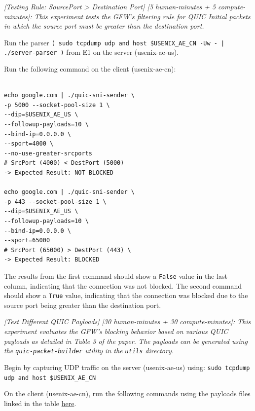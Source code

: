 \begin{compactdesc}
\begin{asparadesc}
\end{asparadesc}



\item[(E2):] \textit{[Testing Rule: SourcePort > Destination Port] [5 human-minutes + 5 compute-minutes]: This experiment tests the GFW's filtering rule for QUIC Initial packets in which the source port must be greater than the destination port.}
\begin{asparadesc}
    \item[Preparation:] Run the parser \texttt{( sudo tcpdump udp and host \$USENIX\_AE\_CN -Uw - | ./server-parser )} from E1 on the server (usenix-ae-us). 
    \item[Execution:] Run the following command on the client (usenix-ae-cn):

\begin{verbatim}

echo google.com | ./quic-sni-sender \ 
-p 5000 --socket-pool-size 1 \ 
--dip=$USENIX_AE_US \
--followup-payloads=10 \ 
--bind-ip=0.0.0.0 \
--sport=4000 \
--no-use-greater-srcports 
# SrcPort (4000) < DestPort (5000) 
-> Expected Result: NOT BLOCKED

echo google.com | ./quic-sni-sender \ 
-p 443 --socket-pool-size 1 \ 
--dip=$USENIX_AE_US \
--followup-payloads=10 \ 
--bind-ip=0.0.0.0 \
--sport=65000 
# SrcPort (65000) > DestPort (443) \ 
-> Expected Result: BLOCKED

\end{verbatim}
        \item [Results] The results from the first command should show a \texttt{False} value in the last column, indicating that the connection was not blocked. The second command should show a \texttt{True} value, indicating that the connection was blocked due to the source port being greater than the destination port. 


    \end{asparadesc}

    \item[(E3):] \textit{[Test Different QUIC Payloads] [30 human-minutes + 30 compute-minutes]: This experiment evaluates the GFW's blocking behavior based on various QUIC payloads as detailed in Table 3 of the paper. The payloads can be generated using the \texttt{quic-packet-builder} utility in the \texttt{utils} directory.}
    
    \begin{asparadesc}
        \item[Preparation:] Begin by capturing UDP traffic on the server (usenix-ae-us) using: \texttt{sudo tcpdump udp and host \$USENIX\_AE\_CN} 
        \item[Execution:] On the client (usenix-ae-cn), run the following commands using the payloads files linked in the table \href{https://github.com/gfw-report/usenixsecurity25-quic-sni?tab=readme-ov-file#experiment-3-testing-quic-payloads-listed-in-table-3-of-the-paper}{here}.
        

\end{asparadesc}
\end{compactdesc}
